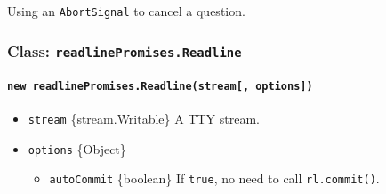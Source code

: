 Using an \texttt{AbortSignal} to cancel a question.

\begin{Shaded}
\begin{Highlighting}[]
\OperatorTok{=}\NormalTok{(}\NormalTok{)}\OperatorTok{;}

\NormalTok{(}\OperatorTok{,}\NormalTok{ () }\KeywordTok{=\textgreater{}}\NormalTok{ \{}
  \NormalTok{(}\NormalTok{)}\OperatorTok{;}
\NormalTok{\}}\OperatorTok{,}\NormalTok{ \{ }\OperatorTok{:} \NormalTok{ \})}\OperatorTok{;}

\OperatorTok{=} \NormalTok{(}\OperatorTok{,}\OperatorTok{;}
\NormalTok{(}\SpecialCharTok{$\{}\SpecialCharTok{\}}\VerbatimStringTok{\textasciigrave{}}\NormalTok{)}\OperatorTok{;}
\end{Highlighting}
\end{Shaded}

\subsubsection{\texorpdfstring{Class:
\texttt{readlinePromises.Readline}}{Class: readlinePromises.Readline}}\label{class-readlinepromises.readline}

\paragraph{\texorpdfstring{\texttt{new\ readlinePromises.Readline(stream{[},\ options{]})}}{new readlinePromises.Readline(stream{[}, options{]})}}\label{new-readlinepromises.readlinestream-options}

\begin{itemize}
\tightlist
\item
  \texttt{stream} \{stream.Writable\} A \href{tty.md}{TTY} stream.
\item
  \texttt{options} \{Object\}

  \begin{itemize}
  \tightlist
  \item
    \texttt{autoCommit} \{boolean\} If \texttt{true}, no need to call
    \texttt{rl.commit()}.
  \end{itemize}
\end{itemize}

